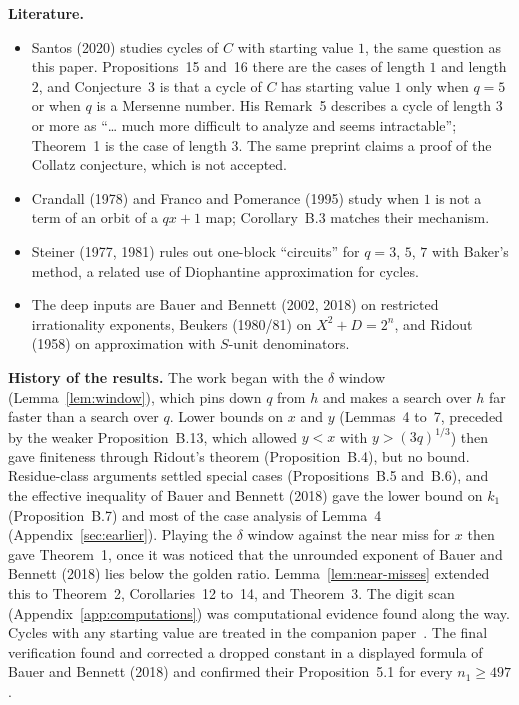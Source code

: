 \documentclass[11pt]{article}
\newcommand{\topic}[1]{\par\noindent\textbf{#1}}
\begin{document}
\topic{Literature.}
\begin{itemize}
\item Santos (2020) studies cycles of $C$ with starting value $1$, the same question as this paper.
Propositions~15 and~16 there are the cases of length $1$ and length $2$, and Conjecture~3 is that a cycle of $C$ has starting value $1$ only when $q = 5$ or when $q$ is a Mersenne number.
His Remark~5 describes a cycle of length $3$ or more as ``\ldots{} much more difficult to analyze and seems intractable''; Theorem~1 is the case of length $3$.
The same preprint claims a proof of the Collatz conjecture, which is not accepted.
\item Crandall (1978) and Franco and Pomerance (1995) study when $1$ is not a term of an orbit of a $qx+1$ map; Corollary~B.3 matches their mechanism.
\item Steiner (1977, 1981) rules out one-block ``circuits'' for $q = 3$, $5$, $7$ with Baker's method, a related use of Diophantine approximation for cycles.
\item The deep inputs are Bauer and Bennett (2002, 2018) on restricted irrationality exponents, Beukers (1980/81) on $X^2 + D = 2^n$, and Ridout (1958) on approximation with $S$-unit denominators.
\end{itemize}

\topic{History of the results.}
The work began with the $\delta$ window (Lemma~\ref{lem:window}), which pins down $q$ from $h$ and makes a search over $h$ far faster than a search over $q$.
Lower bounds on $x$ and $y$ (Lemmas~4 to~7, preceded by the weaker Proposition~B.13, which allowed $y < x$ with $y > (3q)^{1/3}$) then gave finiteness through Ridout's theorem (Proposition~B.4), but no bound.
Residue-class arguments settled special cases (Propositions~B.5 and~B.6), and the effective inequality of Bauer and Bennett (2018) gave the lower bound on $k_1$ (Proposition~B.7) and most of the case analysis of Lemma~4 (Appendix~\ref{sec:earlier}). Playing the $\delta$ window against the near miss for $x$ then gave Theorem~1, once it was noticed that the unrounded exponent of Bauer and Bennett (2018) lies below the golden ratio.
Lemma~\ref{lem:near-misses} extended this to Theorem~2, Corollaries~12 to~14, and Theorem~3.
The digit scan (Appendix~\ref{app:computations}) was computational evidence found along the way.
Cycles with any starting value are treated in the companion paper~\cite{hackman-ii}.
The final verification found and corrected a dropped constant in a displayed formula of Bauer and Bennett (2018) and confirmed their Proposition~5.1 for every $n_1 \ge 497$.
\end{document}
